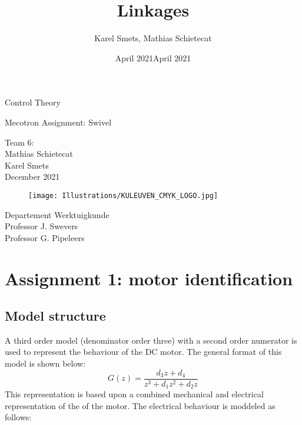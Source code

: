 \documentclass[a4paper]{article}
\title{\vspace{5cm} \Huge Linkages}
\author{Karel Smets, Mathias Schietecat}
\date{April 2021}
\def\mydate{December 2021}
\begin{document}
\begin{titlepage}
\date{April 2021}
    \begin{center}
        \vspace*{1cm}
        
        \Huge
        Control Theory 
        
        \vspace{0.5cm}
        \Huge
        Mecotron Assignment: Swivel
        
        \vspace{1.5cm}
        \large
        Team 6:\\
        Mathias Schietecat\\
        Karel Smets\\
        \vspace{1cm}
        \mydate 
        
        \vfill
        
        \begin{figure}[h]
        \centering
        \texttt{[image: Illustrations/KULEUVEN\_CMYK\_LOGO.jpg]}
        \end{figure}
        
        \vspace{1cm}
        \large
        Departement Werktuigkunde\\
        Professor J. Swevers\\
        Professor G. Pipeleers\\
    \end{center}
\end{titlepage}

\newpage

\setcounter{page}{2}
\tableofcontents

\newpage

\section{Assignment 1: motor identification}

\subsection{Model structure}


A third order model (denominator order three) with a second order numerator is used to represent the behaviour of the DC motor. The general format of this model is shown below:
\begin{equation}
    G(z)=\frac{d_{3} z+d_{4}}{z^{3}+d_{1} z^{2}+d_{2} z}
    \label{eq:model}
\end{equation}
This representation is based upon a combined mechanical and electrical representation of the  of the motor. The electrical behaviour is moddeled as follows:
\end{document}
